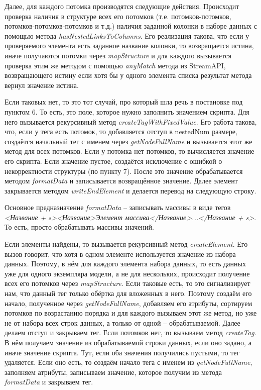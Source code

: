 \documentclass[a4paper,12pt]{diplom}
\begin{document}
Далее, для каждого потомка производятся следующие действия. Происходит проверка наличия в структуре всех его потомков (т.е. потомков-потомков, потомков-потомков-потомков и т.д.) наличия заданной колонки в наборе данных с помощью метода \textit{hasNestedLinksToColumns}. Его реализация такова, что если у проверяемого элемента есть заданное название колонки, то возвращается истина, иначе получаются потомки через \textit{mapStructure} и для каждого вызывается проверка этим же методом с помощью \textit{anyMatch} метода из StreamAPI, возвращающего истину если хотя бы у одного элемента списка результат метода вернул значение истина.

Если таковых нет, то это тот случай, про который шла речь в постановке под пунктом 6. То есть, это поле, которое нужно заполнить значением скрипта. Для него вызывается рекурсивный метод \textit{createTagWithFixedValue}. Его работа такова, что, если у тега есть потомок, то добавляется отступ в nestedNum размере, создаётся начальный тег с именем через \textit{getNodeFullName} и вызывается этот же метод для всех потомков. Если у потомка нет потомков, то вычисляется значение его скрипта. Если значение пустое, создаётся исключение с ошибкой о некорректности структуры (по пункту 7). После это значение обрабатывается методом \textit{formatData} и записывается возвращённое значение. Далее элемент закрывается методом \textit{writeEndElement} и делается перевод на следующую строку.

Основное предназначение \textit{formatData} -- записывать массивы в виде тегов \textit{<Название + s><Название>Элемент массива</Название>...</Название + s>}. То есть, просто обрабатывать массивы значений.

Если элементы найдены, то вызывается рекурсивный метод \textit{createElement}. Его вызов говорит, что хотя в одном элементе используется значение из набора данных. Поэтому, в нём для каждого элемента набора данных, то есть данных уже для одного экземпляра модели, а не для нескольких, происходит получение всех его потомков через \textit{mapStructure}. Если таковые есть, то это сигнализирует нам, что данный тег только обёртка для вложенных в него. Поэтому создаём его начало, полученное через \textit{getNodeFullName}, добавляем его атрибуты, сортируем потомков по возрастанию порядка и для каждого вызываем этот же метод, но уже не от набора всех строк данных, а только от одной -- обрабатываемой. Далее делаем отступ и закрываем тег. Если потомков нет, то вызываем метод \textit{createTag}. В нём получаем значение из обрабатываемой строки данных, если оно задано, а иначе значение скрипта. Тут, если оба значения получились пустыми, то тег удаляется. Если оно есть, то создаём начало тега с именем из \textit{getNodeFullName}, заполняем атрибуты, записываем значение, которое получим из метода \textit{formatData} и закрываем тег.
\end{document}

